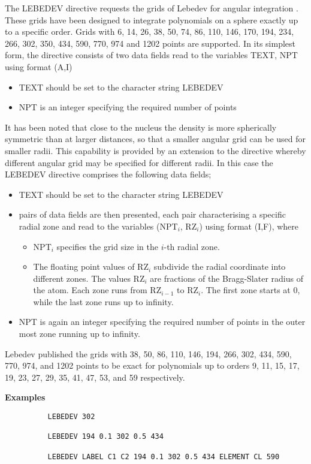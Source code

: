 \documentclass[11pt,fleqn]{article}
\begin{document}
The LEBEDEV directive requests the grids of Lebedev for angular
integration \cite{lebe99}.  These grids have been
designed to integrate polynomials on a sphere exactly up to a specific
order.  Grids with 6, 14, 26, 38, 50, 74, 86, 110, 146, 170, 194, 234, 
266, 302, 350, 434, 590, 770, 974 and 1202 points are supported. 
In its simplest form, the directive consists of
two data fields read to the variables TEXT, NPT using format (A,I)
\begin{itemize}
\item TEXT should be set to the character string LEBEDEV
\item NPT is an integer specifying the required number of points
\end{itemize}
It has been noted that close to the nucleus the density is more spherically
symmetric than at larger distances, so that a smaller angular grid can be used
for smaller radii. This capability is provided by an extension to the directive
whereby different angular grid may be specified for different radii. In this
case the LEBEDEV directive comprises the following data fields;
\begin{itemize}
\item TEXT should be set to the character string LEBEDEV
\item pairs of data fields are then presented, each pair characterising a
specific radial zone and read to the variables (NPT$_i$, RZ$_i$) using format 
(I,F), where
\begin{itemize}
\item NPT$_i$ specifies the grid size in the $i$-th radial zone.
\item The floating point values of RZ$_i$ subdivide the radial coordinate
into different zones. The values RZ$_i$ are fractions of the
Bragg-Slater radius \cite{slater64} of the atom. Each zone runs from
RZ$_{i-1}$ to RZ$_i$. The first zone starts at 0, while the last zone runs up 
to infinity.
\end{itemize}
\item NPT is again an integer specifying the required number of points in 
      the outer most zone running up to infinity.
\end{itemize}
Lebedev published the grids with 38, 50, 86, 110, 146, 194, 266, 302, 434,
590, 770, 974, and 1202
points to be exact for polynomials up to orders 9, 11, 15, 17, 19, 23, 27,
29, 35, 41, 47, 53, and 59 respectively.

{\bf Examples}

{
\footnotesize
\begin{verbatim}
          LEBEDEV 302

          LEBEDEV 194 0.1 302 0.5 434

          LEBEDEV LABEL C1 C2 194 0.1 302 0.5 434 ELEMENT CL 590
\end{verbatim}
}
\end{document}
